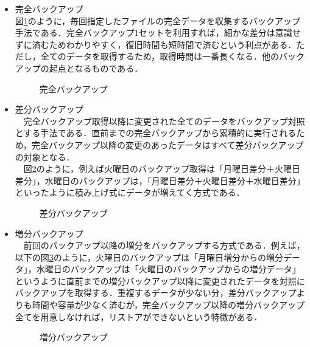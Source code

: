 \documentclass[a4j,titlepage]{jarticle}
\begin{document}
\begin{itemize}
\item 完全バックアップ\\
  図\ref{fig:full}のように，毎回指定したファイルの完全データを収集するバックアップ手法である．完全バックアップ1セットを利用すれば，細かな差分は意識せずに済むためわかりやすく，復旧時間も短時間で済むという利点がある．ただし，全てのデータを取得するため，取得時間は一番長くなる．他のバックアップの起点となるものである．

  \begin{figure}[htbp]
    \begin{center}
      \caption{完全バックアップ}
     \label{fig:full}
   \end{center}
  \end{figure}

\newpage
\item 差分バックアップ\\
　完全バックアップ取得以降に変更された全てのデータをバックアップ対照とする手法である．直前までの完全バックアップから累積的に実行されるため，完全バックアップ以降の変更のあったデータはすべて差分バックアップの対象となる．\\
  　図\ref{fig:sabun}のように，例えば火曜日のバックアップ取得は「月曜日差分＋火曜日差分」，水曜日のバックアップは，「月曜日差分＋火曜日差分＋水曜日差分」といったように積み上げ式にデータが増えてく方式である．

  \begin{figure}[htbp]
    \begin{center}
      \caption{差分バックアップ}
     \label{fig:sabun}
   \end{center}
  \end{figure}


\item 増分バックアップ\\
　前回のバックアップ以降の増分をバックアップする方式である．例えば，以下の図\ref{fig:zoubun}のように，火曜日のバックアップは「月曜日増分からの増分データ」，水曜日のバックアップは「火曜日のバックアップからの増分データ」というように直前までの増分バックアップ以降に変更されたデータを対照にバックアップを取得する．重複するデータが少ない分，差分バックアップよりも時間や容量が少なく済むが，完全バックアップ以降の増分バックアップ全てを用意しなければ，リストアができないという特徴がある\cite{bib:backtext}．

  \begin{figure}[htbp]
    \begin{center}
      \caption{増分バックアップ}
     \label{fig:zoubun}
   \end{center}
  \end{figure}
  
\end{itemize}
\end{document}
